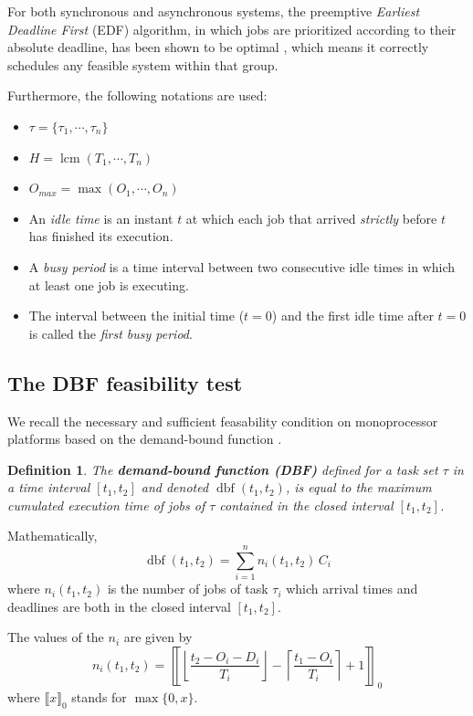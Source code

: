 \documentclass[conference]{IEEEtran}
\newtheorem{definition}{Definition}
\newcommand{\dbf}[1]{\operatorname{dbf}(#1)}
\begin{document}
		For both synchronous and asynchronous systems, the preemptive
		\emph{Earliest Deadline First} (EDF) algorithm, in which jobs are prioritized according to their absolute deadline, has been
		shown to be optimal \cite{liu1973scheduling}, which means it
		correctly schedules any feasible system within that group.

		Furthermore, the following notations are used:
		\begin{itemize}
			\item $\tau = \{\tau_1, \cdots, \tau_{n}\}$
			\item $H = \operatorname{lcm}(T_1, \cdots, T_{n})$
			\item $O_{max} = \max (O_1, \cdots, O_{n})$
			\item An \emph{idle time} is an instant $t$ at which each job that arrived
			\emph{strictly} before $t$ has finished its execution.
			\item A \emph{busy period} is a time interval between two consecutive idle times in
			which at least one job is executing.
			\item The interval between the initial time ($t=0$) and the first
			idle time after $t=0$ is called the \emph{first busy period}.
		\end{itemize}

	\subsection{The DBF feasibility test}
		We recall the necessary and sufficient feasability condition on monoprocessor
		platforms based on the demand-bound function \cite{baruah1999generalized,
		baruah1990algorithms}.

		\begin{definition}
			The \textbf{demand-bound function (DBF)}
			defined for a task set $\tau$ in a time interval $[t_1, t_2]$ and denoted $\dbf{t_1, t_2}$, is
			equal to the maximum cumulated execution time of jobs of $\tau$ contained in the
			closed interval $[t_1, t_2]$.
		\end{definition}

		Mathematically,
		\begin{equation}
			\dbf{t_1, t_2} = \sum_{i=1}^{n} n_i(t_1, t_2) \, C_i
		\end{equation}
		where $n_i(t_1, t_2)$ is the number of jobs of task $\tau_i$ which arrival times
		and deadlines are both in the closed interval $[t_1, t_2]$.

		The values of the $n_i$ are given by \cite{baruah1999generalized}
		\begin{equation}
			n_i(t_1, t_2) =
			\left\llbracket
				\left\lfloor
					\frac{t_2 - O_i - D_i}{T_i}
				\right\rfloor -
				\left\lceil
					\frac{t_1 - O_i}{T_i}
				\right\rceil + 1
			\right\rrbracket_0
		\end{equation}
		where $\llbracket x \rrbracket_0$ stands for $\max \{ 0, x \}$.
\end{document}
